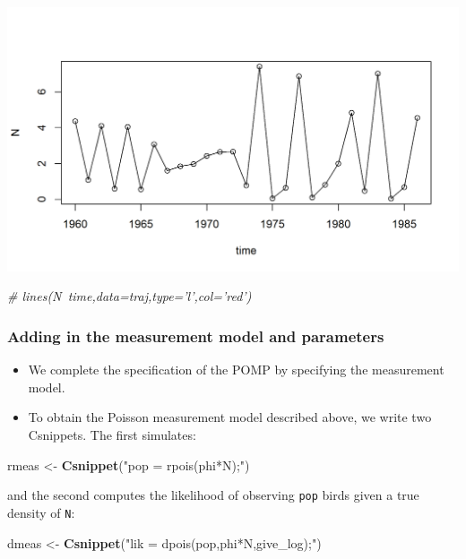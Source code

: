 \documentclass[]{article}
\newenvironment{Shaded}{\begin{snugshade}}{\end{snugshade}}
\newcommand{\KeywordTok}[1]{\textcolor[rgb]{0.13,0.29,0.53}{\textbf{#1}}}
\newcommand{\StringTok}[1]{\textcolor[rgb]{0.31,0.60,0.02}{#1}}
\newcommand{\CommentTok}[1]{\textcolor[rgb]{0.56,0.35,0.01}{\textit{#1}}}
\newcommand{\NormalTok}[1]{#1}
\begin{document}
\begin{center}\includegraphics{figure/intro-ricker-first-sim-1} \end{center}

\begin{Shaded}
\begin{Highlighting}[]
\CommentTok{# lines(N~time,data=traj,type='l',col='red')}
\end{Highlighting}
\end{Shaded}

\subsubsection{Adding in the measurement model and
parameters}\label{adding-in-the-measurement-model-and-parameters}

\begin{itemize}
\item
  We complete the specification of the POMP by specifying the
  measurement model.
\item
  To obtain the Poisson measurement model described above, we write two
  Csnippets. The first simulates:
\end{itemize}

\begin{Shaded}
\begin{Highlighting}[]
\NormalTok{rmeas <-}\StringTok{ }\KeywordTok{Csnippet}\NormalTok{(}\StringTok{"pop = rpois(phi*N);"}\NormalTok{)}
\end{Highlighting}
\end{Shaded}

and the second computes the likelihood of observing \texttt{pop} birds
given a true density of \texttt{N}:

\begin{Shaded}
\begin{Highlighting}[]
\NormalTok{dmeas <-}\StringTok{ }\KeywordTok{Csnippet}\NormalTok{(}\StringTok{"lik = dpois(pop,phi*N,give_log);"}\NormalTok{)}
\end{Highlighting}
\end{Shaded}
\end{document}
